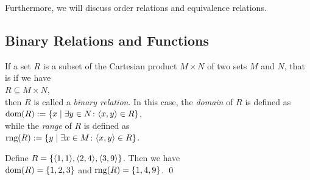 Furthermore, we will discuss order relations and equivalence relations.

\subsection{Binary Relations and Functions}
If a set $R$ is a subset of the Cartesian product $M \times N$ of two sets $M$ and $N$,
that is  if we have \\[0.2cm]
\hspace*{1.3cm} $R \subseteq M \times N$, \\[0.2cm]
then $R$ is called a \emph{binary relation}.  In this case, the \emph{domain} of  $R$ is
defined as 
\\[0.2cm]
\hspace*{1.3cm} 
$\textrm{dom}(R) := \{ x \mid \exists y \in N \colon \langle x, y \rangle \in R \}$,
\\[0.2cm]
while the \emph{range} of $R$ is defined as 
\\[0.2cm]
\hspace*{1.3cm} 
$\textrm{rng}(R) := \{ y \mid \exists x \in M \colon \langle x, y \rangle \in R\}$.


\example
Define $R = \{ \pair(1,1), \pair(2,4), \pair(3,9) \}$.  Then we have \\[0.2cm]
\hspace*{1.3cm} $\textrm{dom}(R) = \{1,2,3\}$ \quad and \quad $\textrm{rng}(R) = \{1,4,9\}$. \qed
\next


